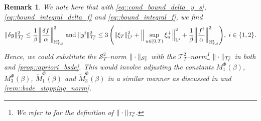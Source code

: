 \documentclass[10pt]{article} %
\newtheorem{remark}[theorem]{Remark}
\newcommand\cS{\mathcal S}
\newcommand\cT{\mathcal T}
\newcommand{\smalltext}[1]{\text{\fontsize{4}{4}\selectfont$#1$}}
\def \H{\mathbb{H}}
\def \L{\mathbb{L}}
\newcommand{\1}{\mathbf{1}}
\begin{document}
\begin{remark}\label{rem::apriori_stopping_norm}
	We note here that with {\rm\eqref{eq::cond_bound_delta_y_s}}, {\rm\eqref{eq::bound_integral_delta_f}} and {\rm\eqref{eq::bound_integral_f}}, we find
	\begin{equation*}
		\|\delta y\|^2_{\cT^\smalltext{2}_\smalltext{T}} \leq \frac{1}{\beta} \bigg\|\frac{\delta f}{\alpha}\bigg\|^2_{\H^\smalltext{2}_{\smalltext{T}\smalltext{,}\smalltext{\beta}}} \; \text{and} \;
		\|y^i\|^2_{\cT^\smalltext{2}_\smalltext{T}} 
		\leq 3 \, \Bigg(\|\xi_T\|^2_{\L^\smalltext{2}} + \Big\|\sup_{u \in [0,T)} \xi^+_u\Big\|^2_{\L^\smalltext{2}} +  \frac{1}{\beta}\bigg\|\frac{f^i}{\alpha}\bigg\|^2_{\H^\smalltext{2}_{\smalltext{T}\smalltext{,}\smalltext{\beta}}}\Bigg), \; i \in \{1,2\}.
	\end{equation*}
	Hence, we could substitute the $\cS^2_T$--norm $\|\cdot\|_{\cS^\smalltext{2}_\smalltext{T}}$ with the $\cT^2_T$--norm\footnote{We refer to  for the definition of $\|\cdot\|_{\cT^\smalltext{2}_\smalltext{T}}$.} $\|\cdot\|_{\cT^\smalltext{2}_\smalltext{T}}$ in both {\rm{}} and {\rm\ref{prop::apriori_bsde}}. This would involve adjusting the constants $M_1^\Phi(\beta)$, $M_3^\Phi(\beta)$, $\widetilde{M}_1^\Phi(\beta)$ and $\widetilde{M}_3^\Phi(\beta)$ in a similar manner as discussed in {\rm{}} and {\rm\ref{rem::bsde_stopping_norm}}.
\end{remark}
\end{document}

